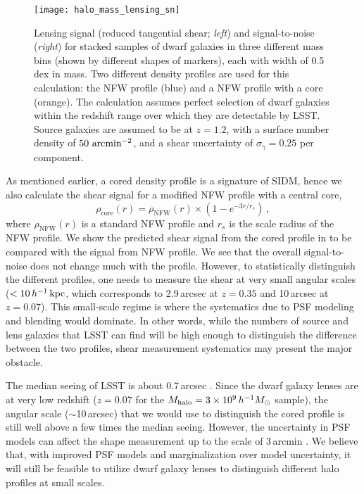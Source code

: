 \begin{figure}
\centering
\texttt{[image: halo\_mass\_lensing\_sn]}
\caption{
\label{fig:dwarf_sn} Lensing signal (reduced tangential shear; \textit{left}) and signal-to-noise (\textit{right}) for stacked samples of dwarf galaxies in three different mass bins (shown by different shapes of markers), each with width of 0.5 dex in mass. Two different density profiles are used for this calculation: the NFW profile (blue) and a NFW profile with a core (orange). 
The calculation assumes perfect selection of dwarf galaxies within the redshift range over which they are detectable by LSST. 
Source galaxies are assumed to be at $z=1.2$, with a surface number density of $50\,\mathrm{\,arcmin}^{-2}$, and a shear uncertainty of $\sigma_\gamma = 0.25$ per component.}
\end{figure}

As mentioned earlier, a cored density profile is a signature of SIDM, hence we also calculate the shear signal for a modified NFW profile with a central core,
\begin{equation}
\rho_\text{core}(r) = \rho_\text{NFW}(r) \times (1 -  e^{-3r/r_s})\,,
\end{equation}
where $\rho_\text{NFW}(r)$ is a standard NFW profile and $r_s$ is the scale radius of the NFW profile. 
We show the predicted shear signal from the cored profile in  to be compared with the signal from NFW profile. 
We see that the overall signal-to-noise does not change much with the profile.  
However, to statistically distinguish the different profiles, one needs to measure the shear at very small angular scales ($< 10\,h^{-1}\mathrm{\,kpc}$, which corresponds to 2.9\,arcsec at $z=0.35$ and 10\,arcsec at $z=0.07$). This small-scale regime is where the systematics due to PSF modeling and blending would dominate. 
In other words, while the numbers of source and lens galaxies that LSST can find will be high enough to distinguish the difference between the two profiles, shear measurement systematics may present the major obstacle. 

The median seeing of LSST is about 0.7\,arcsec \citep[LSST SRD,][]{LPM-17}. Since the dwarf galaxy lenses are at very low redshift ($z=0.07$ for the $M_\text{halo}=3\times10^9\,h^{-1}M_\odot$ sample), the angular scale ($\sim$10\,arcsec) that we would use to distinguish the cored profile is still well above a few times the median seeing. However, the uncertainty in PSF models can affect the shape measurement up to the scale of 3\,arcmin \citep{2012MNRAS.427.2572C}. We believe that, with improved PSF models and marginalization over model uncertainty, it will still be feasible to  utilize dwarf galaxy lenses to distinguish different halo profiles at small scales. 

